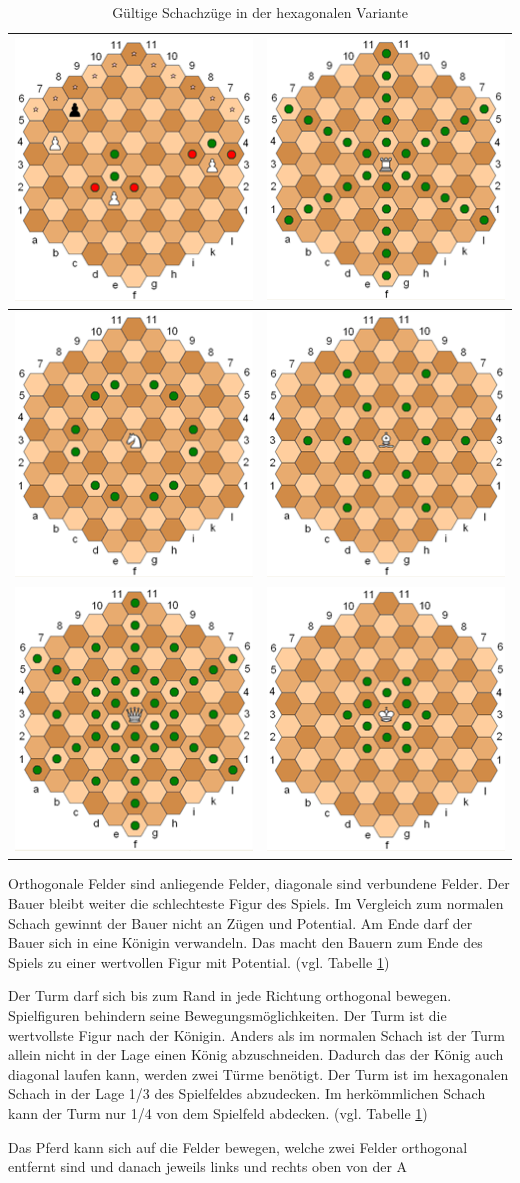 \begin{table}[H]
    \centering
    \begin{tabular}{|c|c|}
        \hline
        \includegraphics{images/hexPawn.png} & \includegraphics{images/hexRook.png} \\ \hline \includegraphics{images/hexKnight.png} & \includegraphics{images/hexBishop.png} \\ \hline \includegraphics{images/hexQueen.png} & \includegraphics{images/hexKing.png} \\ \hline
    \end{tabular}
    \caption{Gültige Schachzüge in der hexagonalen Variante \protect\footnotemark}
    \label{tab:posMove}
\end{table}
Orthogonale Felder sind anliegende Felder, diagonale sind verbundene Felder.
\newpage
Der Bauer bleibt weiter die schlechteste Figur des Spiels. Im Vergleich zum normalen Schach gewinnt der Bauer nicht an Zügen und Potential. Am Ende darf der Bauer sich in eine Königin verwandeln. Das macht den Bauern zum Ende des Spiels zu einer wertvollen Figur mit Potential. \cite{GlinskiHexaChess} (vgl. Tabelle \ref{tab:posMove})\par
Der Turm darf sich bis zum Rand in jede Richtung orthogonal bewegen. Spielfiguren behindern seine Bewegungsmöglichkeiten. Der Turm ist die wertvollste Figur nach der Königin. Anders als im normalen Schach ist der Turm allein nicht in der Lage einen König abzuschneiden. Dadurch das der König auch diagonal laufen kann, werden zwei Türme benötigt. Der Turm ist im hexagonalen Schach in der Lage 1/3 des Spielfeldes abzudecken. Im herkömmlichen Schach kann der Turm nur 1/4 von dem Spielfeld abdecken. \cite{GlinskiHexaChess} (vgl. Tabelle \ref{tab:posMove})\par
Das Pferd kann sich auf die Felder bewegen, welche zwei Felder orthogonal entfernt sind und danach jeweils links und rechts oben von der A